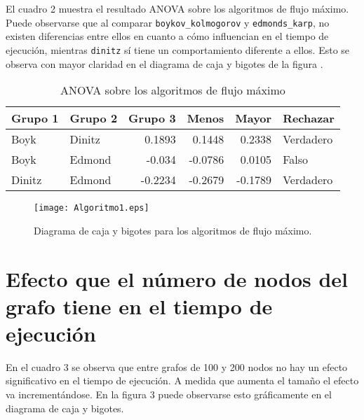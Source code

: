 \documentclass{article}
\begin{document}
El cuadro 2 muestra el resultado ANOVA sobre los algoritmos de flujo máximo. Puede observarse que al comparar \texttt{boykov\_kolmogorov} y \texttt{edmonds\_karp}, no existen diferencias entre ellos en cuanto a cómo influencian en el tiempo de ejecución, mientras \texttt{dinitz} sí tiene un comportamiento diferente a ellos. Esto se observa con mayor claridad en el diagrama de caja y bigotes de la figura \pageref{Figura 3}.


\begin{table}[htbp]
  \centering
  \caption{ANOVA sobre los algoritmos de flujo máximo}
    \begin{tabular}{|l|l|r|r|r|l|}
    \toprule
    \rowcolor[rgb]{ .357,  .608,  .835} \textbf{Grupo 1} & \textbf{Grupo 2} & \multicolumn{1}{l|}{\textbf{Grupo 3}} & \multicolumn{1}{l|}{\textbf{Menos}} & \multicolumn{1}{l|}{\textbf{Mayor}} & \textbf{Rechazar} \\
    \midrule
    Boyk  & Dinitz & 0.1893 & 0.1448 & 0.2338 & Verdadero \\
    \midrule
    Boyk  & Edmond & -0.034 & -0.0786 & 0.0105 & Falso \\
    \midrule
    Dinitz & Edmond & -0.2234 & -0.2679 & -0.1789 & Verdadero \\
    \bottomrule
    \end{tabular}%
  \label{tab:Cuadro 2}%
\end{table}%

\begin{figure}
\begin{center}
  \texttt{[image: Algoritmo1.eps]}
\end{center}
\vspace*{-8mm}
\caption{Diagrama de caja y bigotes para los algoritmos de flujo máximo.}
  \label{Figura 3} 
\end{figure}

\section*{Efecto que el número de nodos del grafo tiene en el tiempo de ejecución}

En el cuadro 3 se observa que entre grafos de 100 y 200 nodos no hay un efecto significativo en el tiempo de ejecución. A medida que aumenta el tamaño el efecto va incrementándose. En la figura 3 puede observarse esto gráficamente en el diagrama de caja y bigotes. 
\end{document}
